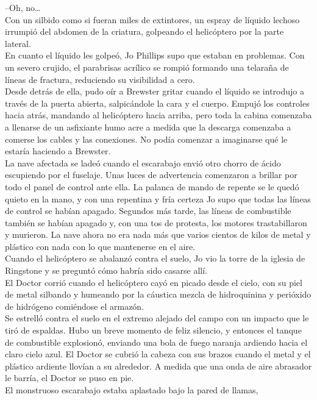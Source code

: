 --Oh, no\ldots{}\\
Con un silbido como si fueran miles de extintores, un espray de líquido
lechoso irrumpió del abdomen de la criatura, golpeando el helicóptero
por la parte lateral.\\[2\baselineskip]En cuanto el líquido les golpeó,
Jo Phillips supo que estaban en problemas. Con un severo crujido, el
parabrisas acrílico se rompió formando una telaraña de líneas de
fractura, reduciendo su visibilidad a cero.\\
Desde detrás de ella, pudo oír a Brewster gritar cuando el líquido se
introdujo a través de la puerta abierta, salpicándole la cara y el
cuerpo. Empujó los controles hacia atrás, mandando al helicóptero hacia
arriba, pero toda la cabina comenzaba a llenarse de un asfixiante humo
acre a medida que la descarga comenzaba a comerse los cables y las
conexiones. No podía comenzar a imaginarse qué le estaría haciendo a
Brewster.\\
La nave afectada se ladeó cuando el escarabajo envió otro chorro de
ácido escupiendo por el fuselaje. Unas luces de advertencia comenzaron a
brillar por todo el panel de control ante ella. La palanca de mando de
repente se le quedó quieto en la mano, y con una repentina y fría
certeza Jo supo que todas las líneas de control se habían apagado.
Segundos más tarde, las líneas de combustible también se habían apagado
y, con una tos de protesta, los motores trastabillaron y murieron. La
nave ahora no era nada más que varios cientos de kilos de metal y
plástico con nada con lo que mantenerse en el aire.\\
Cuando el helicóptero se abalanzó contra el suelo, Jo vio la torre de la
iglesia de Ringstone y se preguntó cómo habría sido casarse
allí.\\[2\baselineskip]El Doctor corrió cuando el helicóptero cayó en
picado desde el cielo, con su piel de metal silbando y humeando por la
cáustica mezcla de hidroquinina y perióxido de hidrógeno comiéndose el
armazón.\\
Se estrelló contra el suelo en el extremo alejado del campo con un
impacto que le tiró de espaldas. Hubo un breve momento de feliz
silencio, y entonces el tanque de combustible explosionó, enviando una
bola de fuego naranja ardiendo hacia el claro cielo azul. El Doctor se
cubrió la cabeza con sus brazos cuando el metal y el plástico ardiente
llovían a su alrededor. A medida que una onda de aire abrasador le
barría, el Doctor se puso en pie.\\
El monstruoso escarabajo estaba aplastado bajo la pared de llamas,
